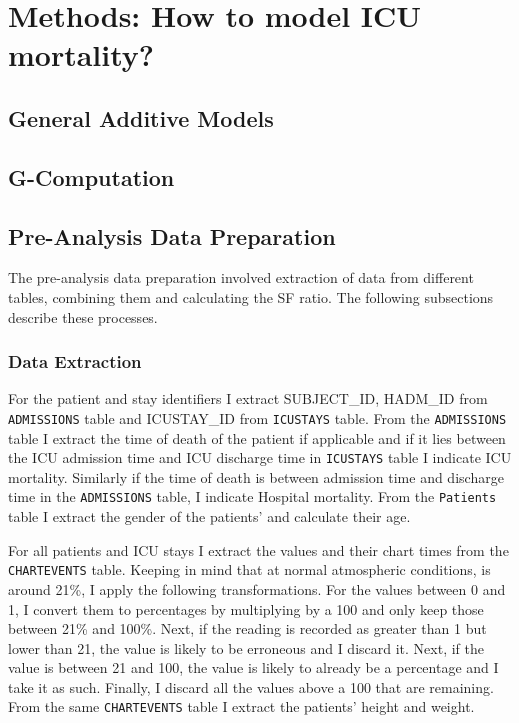 
\chapter{Methods: How to model ICU mortality?} %

\label{Chapter2} %


\section{General Additive Models}

\section{G-Computation}

\section{Pre-Analysis Data Preparation}

The pre-analysis data preparation involved extraction of data from different tables, combining them and calculating the SF ratio. The following subsections  describe these processes. 

\subsection{Data Extraction}

For the patient and stay identifiers I extract SUBJECT\_ID, HADM\_ID from \texttt{ADMISSIONS} table and ICUSTAY\_ID from \texttt{ICUSTAYS} table. From the \texttt{ADMISSIONS} table I extract the time of death of the patient if applicable and if it lies between the ICU admission time and ICU discharge time in \texttt{ICUSTAYS} table I indicate ICU mortality. Similarly if the time of death is between admission time and discharge time in the  \texttt{ADMISSIONS} table, I indicate Hospital mortality. From the \texttt{Patients} table I extract the gender of the patients' and calculate their age.   

For all patients and ICU stays I extract the \Fi values and their chart times from the \texttt{CHARTEVENTS} table. Keeping in mind that at normal atmospheric conditions, \Fi is around 21\%, I apply the following transformations. For the values between 0 and 1, I convert them to percentages by multiplying by a 100 and only keep those between 21\% and 100\%. Next, if the reading is recorded as greater than 1 but lower than 21,  the value is likely to be erroneous and I discard it. Next, if the value is between 21 and 100, the value is likely to already be a percentage and I take it as such. Finally, I discard all the values above a 100 that are remaining. From the same \texttt{CHARTEVENTS} table I extract the patients' height and weight. 

